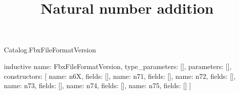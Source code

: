 \begin{lexlean}{Catalog.FbxFileFormatVersion}
\title{Natural number addition}
\begin{semanticmodule}
inductive{
  name: FbxFileFormatVersion,
  type_parameters: [],
  parameters: [],
  constructors: [
    {name: n6X, fields: []},
    {name: n71, fields: []},
    {name: n72, fields: []},
    {name: n73, fields: []},
    {name: n74, fields: []},
    {name: n75, fields: []}
  ]
}
\end{semanticmodule}
\end{lexlean}
